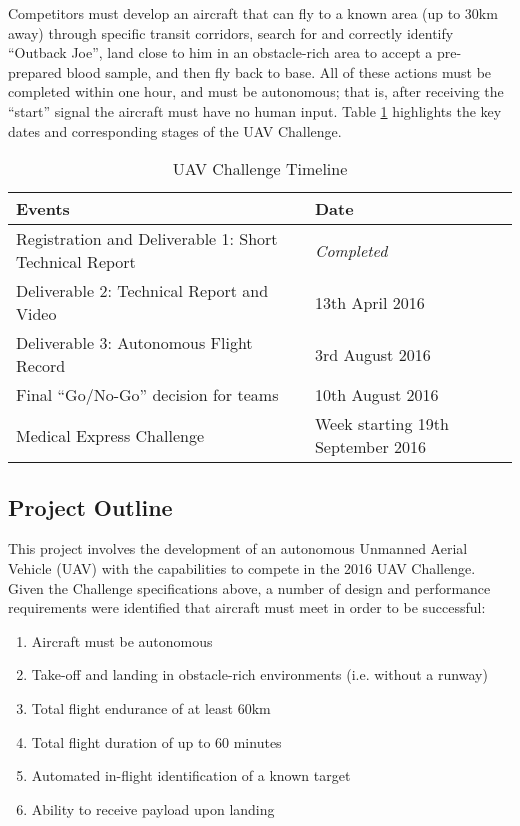 Competitors must develop an aircraft that can fly to a known area (up to 30km away) through specific transit corridors, search for and correctly identify ``Outback Joe'', land close to him in an obstacle-rich area to accept a pre-prepared blood sample, and then fly back to base. All of these actions must be completed within one hour, and must be autonomous; that is, after receiving the ``start'' signal the aircraft must have no human input. Table \ref{tab:challenge} highlights the key dates and corresponding stages of the UAV Challenge.\\

\begin{table}[!ht]
	\caption{UAV Challenge Timeline}
	\label{tab:challenge}
	\centering
	\begin{tabular}{ | l | l | }
		\hline
		\textbf{Events} & \textbf{Date} \\ \hline \hline
		Registration and Deliverable 1: Short Technical Report & \textit{Completed} \\ \hline
		Deliverable 2: Technical Report and Video & 13th April 2016 \\ \hline
		Deliverable 3: Autonomous Flight Record & 3rd August 2016 \\ \hline
		Final ``Go/No-Go'' decision for teams & 10th August 2016 \\ \hline
		Medical Express Challenge & Week starting 19th September 2016 \\
		\hline
	\end{tabular}
\end{table}

\subsection{Project Outline}
This project involves the development of an autonomous Unmanned Aerial Vehicle (UAV) with the capabilities to compete in the 2016 UAV Challenge. Given the Challenge specifications above, a number of design and performance requirements were identified that aircraft must meet in order to be successful:
\begin{enumerate}[label=\bfseries R\arabic*:] \itemsep-2pt
	\item Aircraft must be autonomous
	\item Take-off and landing in obstacle-rich environments (i.e. without a runway)
	\item Total flight endurance of at least 60km
	\item Total flight duration of up to 60 minutes
	\item Automated in-flight identification of a known target
	\item Ability to receive payload upon landing
\end{enumerate}

